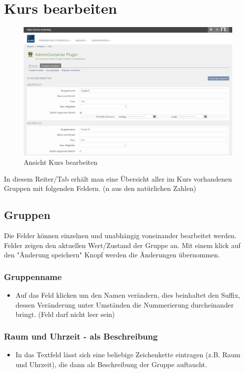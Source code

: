 \section{Kurs bearbeiten}
\begin{figure}
	\centering
	\includegraphics[width=1\textwidth]{img/kursBearbeiten.png}
	\caption{Ansicht Kurs bearbeiten}
\end{figure}

In diesem Reiter/Tab erhält man eine Übersicht aller im Kurs vorhandenen Gruppen mit folgenden Feldern. (n aus den natürlichen Zahlen)
\subsection*{Gruppen}
Die Felder können einzelnen und unabhängig voneinander bearbeitet werden. Felder zeigen den aktuellen Wert/Zustand der Gruppe an. 
Mit einem klick auf den "Änderung speichern" Knopf werden die Änderungen übernommen. 

\subsubsection{Gruppenname}
\begin{itemize}
	\item Auf das Feld klicken um den Namen verändern, dies beinhaltet den Suffix, dessen Veränderung unter Umständen die Nummerierung durcheinander bringt. (Feld darf nicht leer sein)
\end{itemize}

\subsubsection{Raum und Uhrzeit - als Beschreibung}
\begin{itemize}
	\item In das Textfeld lässt sich eine beliebige Zeichenkette eintragen (z.B. Raum und Uhrzeit), die dann als Beschreibung der Gruppe auftaucht. 
\end{itemize}

